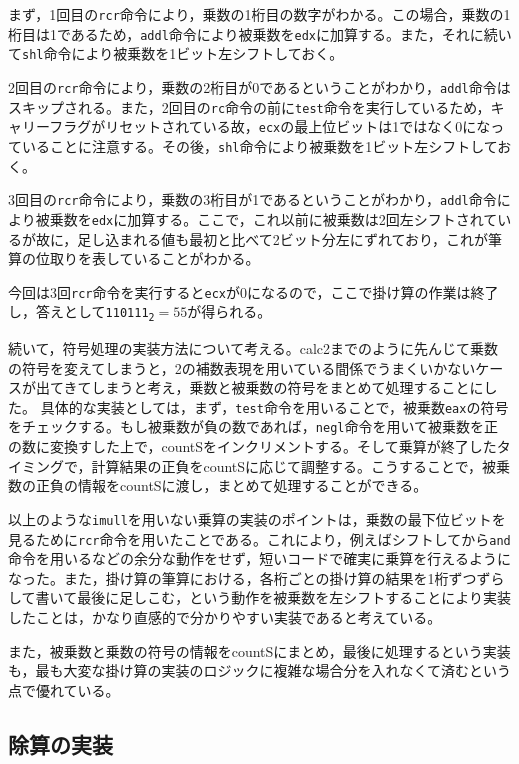 \documentclass[a4paper]{jsarticle}
\newcommand{\var}[1]{\texttt{#1}}
\begin{document}
まず，1回目の\var{rcr}命令により，乗数の1桁目の数字がわかる。この場合，乗数の1桁目は1であるため，\var{addl}命令により被乗数を\var{edx}に加算する。また，それに続いて\var{shl}命令により被乗数を1ビット左シフトしておく。

2回目の\var{rcr}命令により，乗数の2桁目が0であるということがわかり，\var{addl}命令はスキップされる。また，2回目の\var{rc}命令の前に\var{test}命令を実行しているため，キャリーフラグがリセットされている故，\var{ecx}の最上位ビットは1ではなく0になっていることに注意する。その後，\var{shl}命令により被乗数を1ビット左シフトしておく。

3回目の\var{rcr}命令により，乗数の3桁目が1であるということがわかり，\var{addl}命令により被乗数を\var{edx}に加算する。ここで，これ以前に被乗数は2回左シフトされているが故に，足し込まれる値も最初と比べて2ビット分左にずれており，これが筆算の位取りを表していることがわかる。

今回は3回\var{rcr}命令を実行すると\var{ecx}が0になるので，ここで掛け算の作業は終了し，答えとして\texttt{110111\textsubscript{2}}$=55$が得られる。

続いて，符号処理の実装方法について考える。calc2までのように先んじて乗数の符号を変えてしまうと，2の補数表現を用いている間係でうまくいかないケースが出てきてしまうと考え，乗数と被乗数の符号をまとめて処理することにした。
具体的な実装としては，まず，\var{test}命令を用いることで，被乗数\var{eax}の符号をチェックする。もし被乗数が負の数であれば，\var{negl}命令を用いて被乗数を正の数に変換すした上で，countSをインクリメントする。そして乗算が終了したタイミングで，計算結果の正負をcountSに応じて調整する。こうすることで，被乗数の正負の情報をcountSに渡し，まとめて処理することができる。

以上のような\var{imull}を用いない乗算の実装のポイントは，乗数の最下位ビットを見るために\var{rcr}命令を用いたことである。これにより，例えばシフトしてから\var{and}命令を用いるなどの余分な動作をせず，短いコードで確実に乗算を行えるようになった。また，掛け算の筆算における，各桁ごとの掛け算の結果を1桁ずつずらして書いて最後に足しこむ，という動作を被乗数を左シフトすることにより実装したことは，かなり直感的で分かりやすい実装であると考えている。

また，被乗数と乗数の符号の情報をcountSにまとめ，最後に処理するという実装も，最も大変な掛け算の実装のロジックに複雑な場合分を入れなくて済むという点で優れている。

\subsection{除算の実装}
\end{document}
